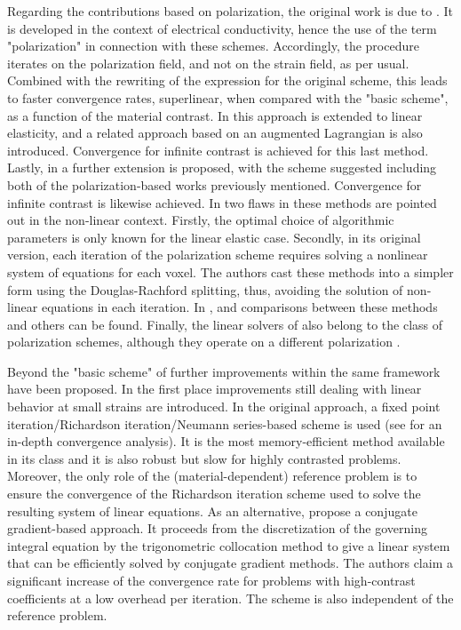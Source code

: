 Regarding the contributions based on polarization, the original work is due to \cite{eyre_fast_1999}.
It is developed in the context of electrical conductivity, hence the use of the term "polarization" in connection with these schemes.
Accordingly, the procedure iterates on the polarization field, and not on the strain field, as per usual.
Combined with the rewriting of the expression for the original scheme, this leads to faster convergence rates, superlinear, when compared with the "basic scheme", as a function of the material contrast.
In \cite{michel_computational_2001} this approach is extended to linear elasticity, and a related approach based on an augmented Lagrangian is also introduced.
Convergence for infinite contrast is achieved for this last method.
Lastly, in \cite{monchiet_polarization-based_2012} a further extension is proposed, with the scheme suggested including both of the polarization-based works previously mentioned.
Convergence for infinite contrast is likewise achieved.
In \cite{schneider_polarization-based_2019} two flaws in these methods are pointed out in the non-linear context.
Firstly, the optimal choice of algorithmic parameters is only known for the linear elastic case.
Secondly, in its original version, each iteration of the polarization scheme requires solving a nonlinear system of equations for each voxel.
The authors cast these methods into a simpler form using the Douglas-Rachford splitting, thus, avoiding the solution of non-linear equations in each iteration.
In \cite{moulinec_comparison_2014}, \cite{moulinec_comparison_2014-1} and \cite{schneider_polarization-based_2019} comparisons between these methods and others can be found.
Finally, the linear solvers of \cite{brisard_fft-based_2010, brisard_combining_2012} also belong to the class of polarization schemes, although they operate on a different polarization \citep{schneider_lippmannschwinger_2020}.

Beyond the "basic scheme" of \cite{moulinec_fast_1994} further improvements within the same framework have been proposed.
In the first place improvements still dealing with linear behavior at small strains are introduced.
In the original approach, a fixed point iteration/Richardson iteration/Neumann series-based scheme is used (see \cite{moulinec_convergence_2018} for an in-depth convergence analysis).
It is the most memory-efficient method available in its class and it is also robust but slow for highly contrasted problems.
Moreover, the only role of the (material-dependent) reference problem is to ensure the convergence of the Richardson iteration scheme used to solve the resulting system of linear equations.
As an alternative, \cite{zeman_accelerating_2010} propose a conjugate gradient-based approach.
It proceeds from the discretization of the governing integral equation by the trigonometric collocation method to give a linear system that can be efficiently solved by conjugate gradient methods.
The authors claim a significant increase of the convergence rate for problems with high-contrast coefficients at a low overhead per iteration.
The scheme is also independent of the reference problem.

